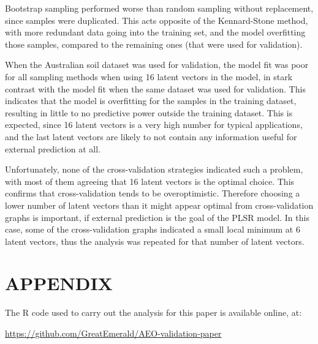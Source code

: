 \documentclass{isprs}
\begin{document}
Bootstrap sampling performed worse than random sampling without replacement, since samples were duplicated. This acts opposite of the Kennard-Stone method, with more redundant data going into the training set, and the model overfitting those samples, compared to the remaining ones (that were used for validation).

When the Australian soil dataset was used for validation, the model fit was poor for all sampling methods when using 16 latent vectors in the model, in stark contrast with the model fit when the same dataset was used for validation. This indicates that the model is overfitting for the samples in the training dataset, resulting in little to no predictive power outside the training dataset. This is expected, since 16 latent vectors is a very high number for typical applications, and the last latent vectors are likely to not contain any information useful for external prediction at all.

Unfortunately, none of the cross-validation strategies indicated such a problem, with most of them agreeing that 16 latent vectors is the optimal choice. This confirms that cross-validation tends to be overoptimistic. Therefore choosing a lower number of latent vectors than it might appear optimal from cross-validation graphs is important, if external prediction is the goal of the PLSR model. In this case, some of the cross-validation graphs indicated a small local minimum at 6 latent vectors, thus the analysis was repeated for that number of latent vectors.



{%
	\begin{spacing}{0.9}%
		
	\end{spacing}
}

\section*{APPENDIX}\label{APPENDIX}

The R code used to carry out the analysis for this paper is available online, at:

\url{https://github.com/GreatEmerald/AEO-validation-paper}
\end{document}
